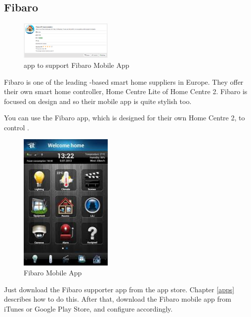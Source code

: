\subsection{Fibaro}

\begin{figure}
\begin{center}
\includegraphics[width=0.4\textwidth]{pngs/cap5/mobile6.png}
\caption{\zway app to support Fibaro Mobile App}
\label{mobile6}
\end{center}
\end{figure}

Fibaro is one of the leading \zwave-based smart home suppliers in Europe. They offer their 
own \zwave smart home controller, Home Centre Lite of Home Centre 2. Fibaro is focused on 
design and so their mobile app is quite stylish too.

You can use the Fibaro app, which is designed for their own Home Centre 2, to control 
\zway.

\begin{figure}
\begin{center}
\includegraphics[width=0.4\textwidth]{pngs/cap5/mobile8.jpeg}
\caption{Fibaro Mobile App}
\label{mobile8}
\end{center}
\end{figure}

Just download the Fibaro supporter app from the \zway app store. Chapter \ref{apps} 
describes how to do this. After that, download the Fibaro mobile app from iTunes or Google 
Play Store, and configure accordingly.

